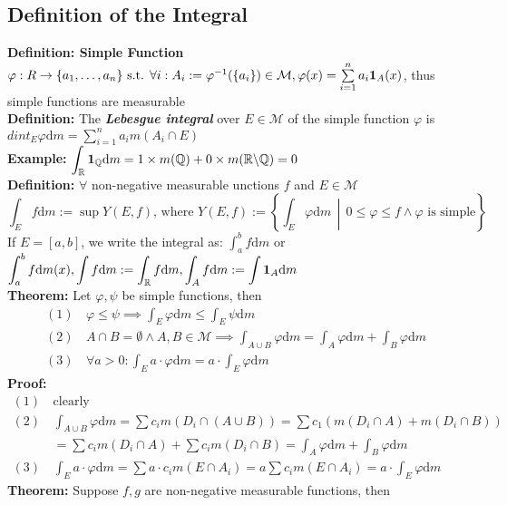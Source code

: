 \documentclass{article}
\newcommand{\R}{\mathbb{R}}
\newcommand{\Q}{\mathbb{Q}}
\newcommand{\sumin}{\sum\limits_{i=1}^n}
\newcommand{\bcsl}{\symbol{92}}
\newcommand{\st}{\mbox{ s.t. }}
\newcommand{\0}{{\bf{0}}}
\newcommand{\1}{{\bf{1}}}
\newcommand{\dint}{\displaystyle\int}
\newcommand{\dif}{\mbox{d}}
\begin{document}
\subsection{Definition of the Integral}
\textbf{Definition: Simple Function}\\
$\varphi:R\to\{a_1,\dots,a_n\}\st\forall i:A_i:=\varphi^{-1}(\{a_i\})\in\mathcal{M},\varphi(x)=\sumin a_i\1_A(x)$, thus simple functions are measurable\\
\textbf{Definition:} The \textit{\textbf{Lebesgue integral}} over $E\in\mathcal{M}$ of the simple function $\varphi$ is $dint_E\varphi \dif m=\sumin a_im(A_i\cap E)$\\
\textbf{Example:} $\dint_\R\1_\Q \dif m=1\times m(\Q)+0\times m(\R\bcsl\Q)=0$\\
\textbf{Definition:} $\forall$ non-negative measurable unctions $f$ and $E\in\mathcal{M}$
$$\dint_Ef\dif m:=\sup Y(E,f)\mbox{, where }Y(E,f):=\left\{\dint_E\varphi \dif m\,\middle\vert\,0\le\varphi\le f\land\varphi\mbox{ is simple}\right\}$$
If $E=[a,b]$, we write the integral as: $\dint_a^b f\dif m$ or $\dint_a^b f\dif m(x),\dint f\dif m:=\dint_\R f\dif m,\dint_A f\dif m:=\dint\1_A\dif m$\\
\textbf{Theorem:} Let $\varphi,\psi$ be simple functions, then
\begin{equation}
\begin{split}
    (1)\,&\varphi\le\psi\implies\int_E\varphi \dif m\le\int_E\psi \dif m\\
    (2)\,&A\cap B=\emptyset\land A,B\in\mathcal{M}\implies\int_{A\cup B}\varphi \dif m=\int_A\varphi \dif m+\int_B\varphi \dif m\\
    (3)\,&\forall a>0:\int_Ea\cdot\varphi \dif m=a\cdot\int_E\varphi \dif m
\end{split}
\end{equation}
\textbf{Proof:}
\begin{equation}
\begin{split}
    (1)\,&\mbox{clearly}\\
    (2)\,&\int_{A\cup B}\varphi \dif m=\sum c_im(D_i\cap(A\cup B))=\sum c_1(m(D_i\cap A)+m(D_i\cap B))\\
    &=\sum c_im(D_i\cap A)+\sum c_im(D_i\cap B)=\int_A\varphi \dif m+\int_B\varphi \dif m\\
    (3)\,&\int_Ea\cdot\varphi \dif m=\sum a\cdot c_im(E\cap A_i)=a\sum c_im(E\cap A_i)=a\cdot\int_E\varphi \dif m
\end{split}
\end{equation}
\textbf{Theorem:} Suppose $f,g$ are non-negative measurable functions, then
\end{document}
